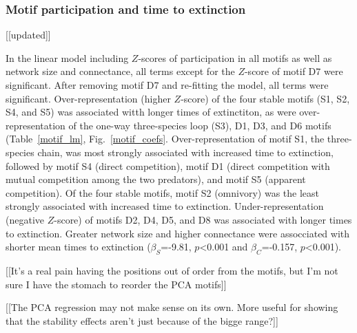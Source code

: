 \documentclass[12pt]{article}
\begin{document}
		\subsubsection*{Motif participation and time to extinction} [[updated]]

			In the linear model including $Z$-scores of participation in all motifs as well as network size and connectance, all terms except for the $Z$-score of motif D7 were significant.
			After removing motif D7 and re-fitting the model, all terms were significant.
			Over-representation (higher $Z$-score) of the four stable motifs (S1, S2, S4, and S5) was associated witth longer times of extinctiton, as were over-representation of the one-way three-species loop (S3), D1, D3, and D6 motifs (Table~\ref{motif_lm}, Fig.~\ref{motif_coefs}. 
			Over-representation of motif S1, the three-species chain, was most strongly associated with increased time to extinction, followed by motif S4 (direct competition), motif D1 (direct competition with mutual competition among the two predators), and motif S5 (apparent competition).
			Of the four stable motifs, motif S2 (omnivory) was the least strongly associated with increased time to extinction.
			Under-representation (negative $Z$-score) of motifs D2, D4, D5, and D8 was associated with longer times to extinction.
			Greater network size and higher connectance were assocciated with shorter mean times to extinction ($\beta_{S}$=-9.81, $p$\textless0.001 and $\beta_{C}$=-0.157, $p$\textless0.001).

			[[It's a real pain having the positions out of order from the motifs, but I'm not sure I have the stomach to reorder the PCA motifs]]

			[[The PCA regression may not make sense on its own. More useful for showing that the stability effects aren't just because of the bigge range?]]
\end{document}
